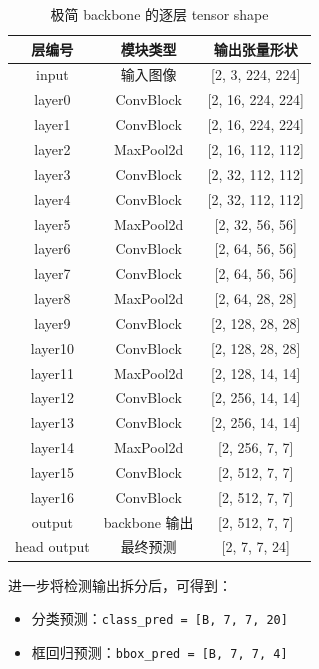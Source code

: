 \documentclass[11pt,a4paper]{article}
\begin{document}
\begin{table}[H]
  \centering
  \caption{极简 backbone 的逐层 tensor shape}
  \label{tab:backbone-shape}
  \small
  \begin{tabular}{ccc}
    \toprule
    层编号 & 模块类型 & 输出张量形状 \\
    \midrule
    input & 输入图像 & [2, 3, 224, 224] \\
    layer0 & ConvBlock & [2, 16, 224, 224] \\
    layer1 & ConvBlock & [2, 16, 224, 224] \\
    layer2 & MaxPool2d & [2, 16, 112, 112] \\
    layer3 & ConvBlock & [2, 32, 112, 112] \\
    layer4 & ConvBlock & [2, 32, 112, 112] \\
    layer5 & MaxPool2d & [2, 32, 56, 56] \\
    layer6 & ConvBlock & [2, 64, 56, 56] \\
    layer7 & ConvBlock & [2, 64, 56, 56] \\
    layer8 & MaxPool2d & [2, 64, 28, 28] \\
    layer9 & ConvBlock & [2, 128, 28, 28] \\
    layer10 & ConvBlock & [2, 128, 28, 28] \\
    layer11 & MaxPool2d & [2, 128, 14, 14] \\
    layer12 & ConvBlock & [2, 256, 14, 14] \\
    layer13 & ConvBlock & [2, 256, 14, 14] \\
    layer14 & MaxPool2d & [2, 256, 7, 7] \\
    layer15 & ConvBlock & [2, 512, 7, 7] \\
    layer16 & ConvBlock & [2, 512, 7, 7] \\
    output & backbone 输出 & [2, 512, 7, 7] \\
    head output & 最终预测 & [2, 7, 7, 24] \\
    \bottomrule
  \end{tabular}
\end{table}

进一步将检测输出拆分后，可得到：

\begin{itemize}
  \item 分类预测：\texttt{class\_pred = [B, 7, 7, 20]}
  \item 框回归预测：\texttt{bbox\_pred = [B, 7, 7, 4]}
\end{itemize}
\end{document}

